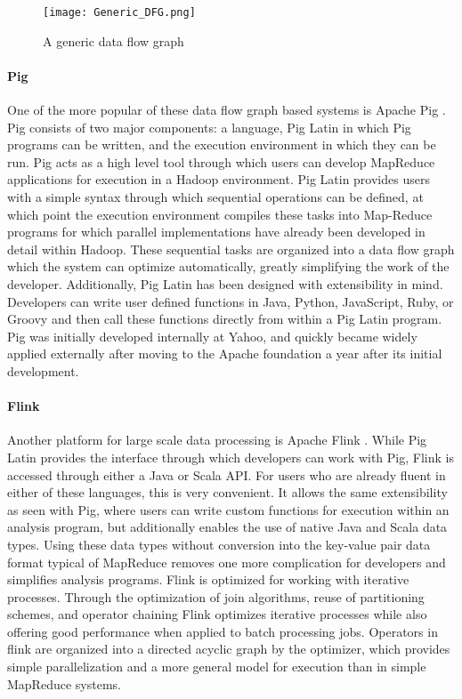 \begin{figure}
	\centering
	\texttt{[image: Generic\_DFG.png]}
	\caption{A generic data flow graph \cite{Ho2008}}
	\label{fig:dfg}
\end{figure}

\paragraph{Pig}
One of the more popular of these data flow graph based systems is Apache Pig \cite{Gates2009}. Pig consists of two major components: a language, Pig Latin \citep{Olston2008a} in which Pig programs can be written, and the execution environment in which they can be run. Pig acts as a high level tool through which users can develop MapReduce applications for execution in a Hadoop environment. Pig Latin provides users with a simple syntax through which sequential operations can be defined, at which point the execution environment compiles these tasks into Map-Reduce programs for which parallel implementations have already been developed in detail within Hadoop. These sequential tasks are organized into a data flow graph which the system can optimize automatically, greatly simplifying the work of the developer. Additionally, Pig Latin has been designed with extensibility in mind. Developers can write user defined functions in Java, Python, JavaScript, Ruby, or Groovy and then call these functions directly from within a Pig Latin program. Pig was initially developed internally at Yahoo, and quickly became widely applied externally after moving to the Apache foundation a year after its initial development. 

\paragraph{Flink}
Another platform for large scale data processing is Apache Flink \citep{Flink2015}. While Pig Latin provides the interface through which developers can work with Pig, Flink is accessed through either a Java or Scala API. For users who are already fluent in either of these languages, this is very convenient. It allows the same extensibility as seen with Pig, where users can write custom functions for execution within an analysis program, but additionally enables the use of native Java and Scala data types. Using these data types without conversion into the key-value pair data format typical of MapReduce removes one more complication for developers and simplifies analysis programs. Flink is optimized for working with iterative processes. Through the optimization of join algorithms, reuse of partitioning schemes, and operator chaining Flink optimizes iterative processes while also offering good performance when applied to batch processing jobs. Operators in flink are organized into a directed acyclic graph by the optimizer, which provides simple parallelization and a more general model for execution than in simple MapReduce systems. 

